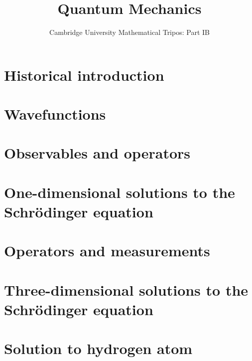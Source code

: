 \documentclass{article}
\title{Quantum Mechanics}
\author{Cambridge University Mathematical Tripos: Part IB}
\begin{document}
\maketitle

\tableofcontentsnewpage{}

\section{Historical introduction}

\section{Wavefunctions}

\section{Observables and operators}

\section{One-dimensional solutions to the Schr\"odinger equation}

\section{Operators and measurements}

\section{Three-dimensional solutions to the Schr\"odinger equation}

\section{Solution to hydrogen atom}

\end{document}
